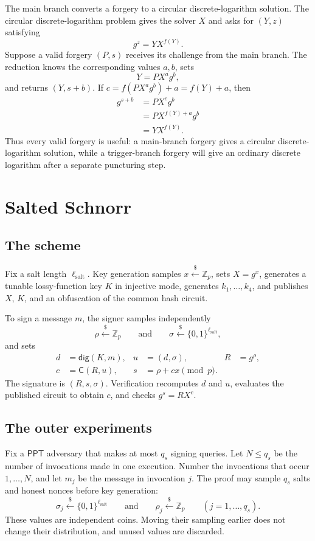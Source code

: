 \documentclass[11pt]{article}
\newcommand{\Zp}{\mathbb{Z}_p}
\newcommand{\bits}{\{0,1\}}
\newcommand{\getsr}{\mathrel{\mathop{\leftarrow}\limits^{\$}}}
\newcommand{\PPT}{\mathsf{PPT}}
\begin{document}
The main branch converts a forgery to a circular discrete-logarithm solution.
The circular discrete-logarithm problem gives the solver \(X\) and asks for
\((Y,z)\) satisfying
\[
  g^z=Y X^{f(Y)}.
\]
Suppose a valid forgery \((P,s)\) receives its challenge from the main branch.
The reduction knows the corresponding values \(a,b\), sets
\[
  Y=PX^a g^b,
\]
and returns \((Y,s+b)\).  If
\(c=f(PX^a g^b)+a=f(Y)+a\), then
\[
\begin{aligned}
  g^{s+b}
   &=P X^c g^b\\
   &=P X^{f(Y)+a}g^b\\
   &=Y X^{f(Y)}.
\end{aligned}
\]
Thus every valid forgery is useful: a main-branch forgery gives a circular
discrete-logarithm solution, while a trigger-branch forgery will give an
ordinary discrete logarithm after a separate puncturing step.

\section{Salted Schnorr}

\subsection{The scheme}

Fix a salt length \(\ell_{\mathrm{salt}}\).  Key generation samples
\(x\getsr\Zp\), sets \(X=g^x\), generates a tunable lossy-function key \(K\)
in injective mode, generates \(k_1,\ldots,k_4\), and publishes \(X\), \(K\),
and an obfuscation of the common hash circuit.

To sign a message \(m\), the signer samples independently
\[
  \rho\getsr\Zp
  \qquad\text{and}\qquad
  \sigma\getsr\bits^{\ell_{\mathrm{salt}}},
\]
and sets
\[
\begin{aligned}
  d&=\mathsf{dig}(K,m),&
  u&=(d,\sigma),&
  R&=g^\rho,\\
  c&=\mathsf{C}(R,u),&
  s&=\rho+cx\pmod p.
\end{aligned}
\]
The signature is \((R,s,\sigma)\).  Verification recomputes \(d\) and \(u\),
evaluates the published circuit to obtain \(c\), and checks
\(g^s=RX^c\).

\subsection{The outer experiments}

Fix a \(\PPT\) adversary that makes at most \(q_s\) signing queries.  Let
\(N\le q_s\) be the number of invocations made in one execution.  Number the
invocations that occur \(1,\ldots,N\), and let \(m_j\) be the message in
invocation \(j\).  The proof may sample \(q_s\) salts and honest nonces before key
generation:
\[
  \sigma_j\getsr\bits^{\ell_{\mathrm{salt}}}
  \qquad\text{and}\qquad
  \rho_j\getsr\Zp
  \qquad (j=1,\ldots,q_s).
\]
These values are independent coins.  Moving their sampling earlier does not
change their distribution, and unused values are discarded.
\end{document}
